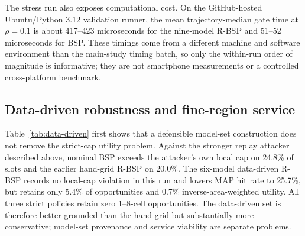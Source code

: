 \documentclass[review,12pt]{elsarticle}
\begin{document}
\begin{table}[tbp]
\centering\small
\caption{Post-hoc boundary characterization at $\rho=0.1$, with 20 new synthetic seed clusters and 80 trajectories per row. ``Interior'' means the correct scalar lies between enumerated ambiguity values but is not itself a member; ``outside'' exceeds the corresponding listed range. Viol. is the informed attacker's local-cap violation rate over 3,840 slots per row.}
\label{tab:robust-boundary}
\end{table}

The stress run also exposes computational cost. On the GitHub-hosted Ubuntu/Python 3.12 validation runner, the mean trajectory-median gate time at $\rho=0.1$ is about 417--423 microseconds for the nine-model R-BSP and 51--52 microseconds for BSP. These timings come from a different machine and software environment than the main-study timing batch, so only the within-run order of magnitude is informative; they are not smartphone measurements or a controlled cross-platform benchmark.

\subsection{Data-driven robustness and fine-region service}
\label{sec:data-driven-results}
Table~\ref{tab:data-driven} first shows that a defensible model-set construction does not remove the strict-cap utility problem. Against the stronger replay attacker described above, nominal BSP exceeds the attacker's own local cap on 24.8\% of slots and the earlier hand-grid R-BSP on 20.0\%. The six-model data-driven R-BSP records no local-cap violation in this run and lowers MAP hit rate to 25.7\%, but retains only 5.4\% of opportunities and 0.7\% inverse-area-weighted utility. All three strict policies retain zero 1--8-cell opportunities. The data-driven set is therefore better grounded than the hand grid but substantially more conservative; model-set provenance and service viability are separate problems.

\begin{table}[tbp]
\centering
\caption{Post-hoc GeoLife data-driven robustness at $\rho=0.1$. The replay attacker uses the development-only smoothed population prior and validation point mobility estimate. ``Local viol.'' tests the attacker's pre-output local cap. Weighted retention is Eq.~\eqref{eq:weighted-utility}; small retention covers 1--8-cell opportunities.}
\label{tab:data-driven}{\scriptsize\setlength{\tabcolsep}{3pt}}
\end{table}
\end{document}
